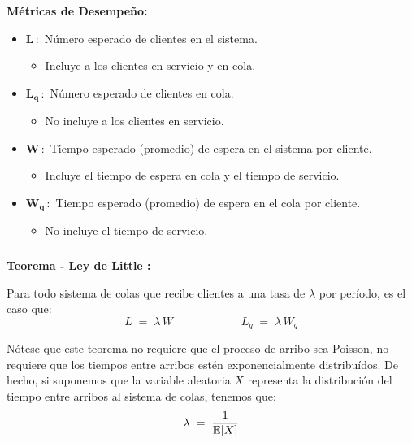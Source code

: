 \documentclass[ 10pt, xcolor = dvipsnames]{beamer}
\begin{document}
\begin{frame}[allowframebreaks]
\textbf{M\'etricas de Desempe\~no:}
\begin{itemize}
\item $\boldsymbol{L \, \colon}$ N\'umero esperado de clientes en el sistema. 
\begin{itemize}
\item Incluye a los clientes en servicio y en cola. 
\end{itemize}
\item $\boldsymbol{L_q \, \colon}$ N\'umero esperado de clientes en cola. 
\begin{itemize}
\item No incluye a los clientes en servicio. 
\end{itemize}
\item $\boldsymbol{W \, \colon}$ Tiempo esperado (promedio) de espera en el sistema por cliente. 
\begin{itemize}
\item Incluye el tiempo de espera en cola y el tiempo de servicio. 
\end{itemize}
\item $\boldsymbol{W_q \, \colon}$ Tiempo esperado (promedio) de espera en el cola por cliente. 
\begin{itemize}
\item No incluye el tiempo de servicio. 
\end{itemize}
\end{itemize}

\end{frame}

\begin{frame}[allowframebreaks]
\frametitle{\insertsection}

\textbf{Teorema - Ley de Little :}

Para todo sistema de colas que recibe clientes a una tasa de $\lambda$ por per\'iodo, \linebreak es el caso que: 
\[
L \; = \; \lambda \, W \qquad \qquad \qquad
L_q \; = \; \lambda \, W_q
\]

N\'otese que este teorema no requiere que el proceso de arribo sea Poisson, \ie \linebreak no requiere que los tiempos entre arribos est\'en exponencialmente distribu\'idos. \linebreak De hecho, si suponemos que la variable aleatoria $X$ representa la distribuci\'on del tiempo entre arribos al sistema de colas, tenemos que: 
\[
\lambda \; = \; \frac{1}{\mathbb{E}[X]}
\]


\end{frame}
\end{document}

